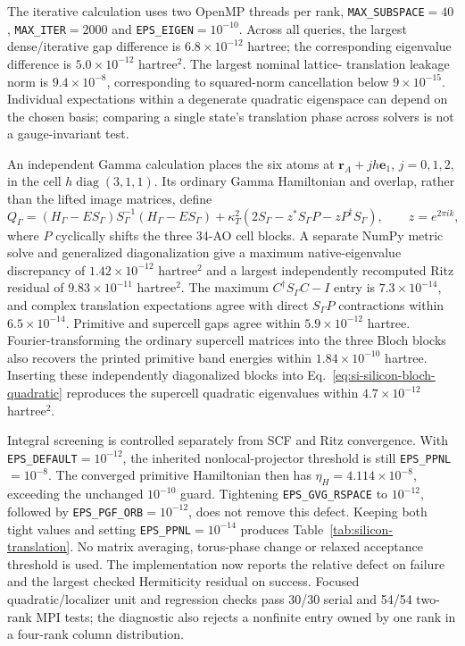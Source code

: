 \documentclass[11pt]{article}
\begin{document}
The iterative calculation uses two OpenMP threads per rank,
\texttt{MAX\_SUBSPACE}$=40$, \texttt{MAX\_ITER}$=2000$ and
\texttt{EPS\_EIGEN}$=10^{-10}$. Across all queries, the largest
dense/iterative gap difference is $6.8\times10^{-12}$ hartree;
the corresponding eigenvalue difference is
$5.0\times10^{-12}$ hartree$^2$. The largest nominal lattice-
translation leakage norm is $9.4\times10^{-8}$, corresponding
to squared-norm cancellation below $9\times10^{-15}$.
Individual expectations within a degenerate quadratic eigenspace
can depend on the chosen basis; comparing a single state's
translation phase across solvers is not a gauge-invariant test.

An independent Gamma calculation places the six atoms at
$\bm r_A+jh\bm e_1$, $j=0,1,2$, in the cell
$h\operatorname{diag}(3,1,1)$. Its ordinary Gamma Hamiltonian
and overlap, rather than the lifted image matrices, define
\begin{equation}
 Q_\Gamma=(H_\Gamma-ES_\Gamma)S_\Gamma^{-1}(H_\Gamma-ES_\Gamma)
       +\kappa_T^2(2S_\Gamma-z^*S_\Gamma P-zP^\dagger S_\Gamma),
 \qquad z=e^{2\pi i k},
\end{equation}
where $P$ cyclically shifts the three 34-AO cell blocks.
A separate NumPy metric solve and generalized diagonalization
give a maximum native-eigenvalue discrepancy of
$1.42\times10^{-12}$ hartree$^2$ and a largest independently
recomputed Ritz residual of $9.83\times10^{-11}$ hartree$^2$.
The maximum $C^\dagger S_\Gamma C-I$ entry is
$7.3\times10^{-14}$, and complex translation expectations agree
with direct $S_\Gamma P$ contractions within $6.5\times10^{-14}$.
Primitive and supercell gaps agree within
$5.9\times10^{-12}$ hartree. Fourier-transforming the ordinary
supercell matrices into the three Bloch blocks also recovers
the printed primitive band energies within
$1.84\times10^{-10}$ hartree. Inserting these independently
diagonalized blocks into Eq.~\eqref{eq:si-silicon-bloch-quadratic}
reproduces the supercell quadratic eigenvalues within
$4.7\times10^{-12}$ hartree$^2$.

Integral screening is controlled separately from SCF and Ritz
convergence. With \texttt{EPS\_DEFAULT}$=10^{-12}$, the inherited
nonlocal-projector threshold is still
\texttt{EPS\_PPNL}$=10^{-8}$. The converged primitive Hamiltonian
then has $\eta_H=4.114\times10^{-8}$, exceeding the unchanged
$10^{-10}$ guard. Tightening \texttt{EPS\_GVG\_RSPACE} to
$10^{-12}$, followed by \texttt{EPS\_PGF\_ORB}$=10^{-12}$,
does not remove this defect. Keeping both tight values and
setting \texttt{EPS\_PPNL}$=10^{-14}$ produces
Table~\ref{tab:silicon-translation}. No matrix averaging,
torus-phase change or relaxed acceptance threshold is used.
The implementation now reports the relative defect on failure
and the largest checked Hermiticity residual on success.
Focused quadratic/localizer unit and regression checks pass
30/30 serial and 54/54 two-rank MPI tests; the diagnostic
also rejects a nonfinite entry owned by one rank in a four-rank
column distribution.
\end{document}
